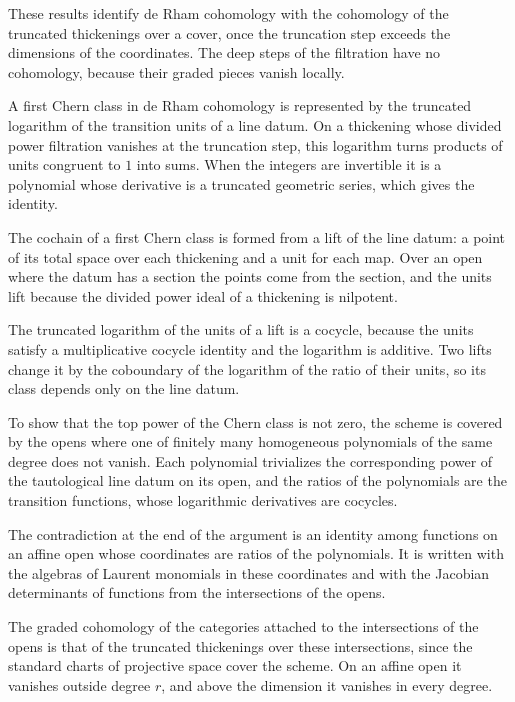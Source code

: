 These results identify de Rham cohomology with the cohomology of the truncated thickenings over a cover, once the
truncation step exceeds the dimensions of the coordinates. The deep steps of the filtration have no cohomology, because
their graded pieces vanish locally.

A first Chern class in de Rham cohomology is represented by the truncated logarithm of the transition units of a line
datum. On a thickening whose divided power filtration vanishes at the truncation step, this logarithm turns products of
units congruent to $1$ into sums. When the integers are invertible it is a polynomial whose derivative is a truncated
geometric series, which gives the identity.

The cochain of a first Chern class is formed from a lift of the line datum: a point of its total space over each
thickening and a unit for each map. Over an open where the datum has a section the points come from the section, and
the units lift because the divided power ideal of a thickening is nilpotent.

The truncated logarithm of the units of a lift is a cocycle, because the units satisfy a multiplicative cocycle identity
and the logarithm is additive. Two lifts change it by the coboundary of the logarithm of the ratio of their units, so its
class depends only on the line datum.

To show that the top power of the Chern class is not zero, the scheme is covered by the opens where one of finitely many
homogeneous polynomials of the same degree does not vanish. Each polynomial trivializes the corresponding power of the
tautological line datum on its open, and the ratios of the polynomials are the transition functions, whose logarithmic
derivatives are cocycles.

The contradiction at the end of the argument is an identity among functions on an affine open whose coordinates are
ratios of the polynomials. It is written with the algebras of Laurent monomials in these coordinates and with the
Jacobian determinants of functions from the intersections of the opens.

The graded cohomology of the categories attached to the intersections of the opens is that of the truncated thickenings
over these intersections, since the standard charts of projective space cover the scheme. On an affine open it vanishes
outside degree $r$, and above the dimension it vanishes in every degree.

